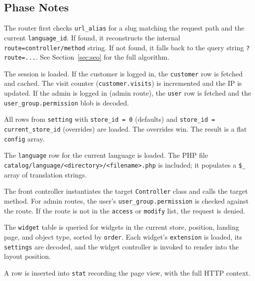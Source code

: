 \documentclass[11pt,a4paper]{article}
\begin{document}
\subsection{Phase Notes}

\begin{description}[leftmargin=1.6em,itemsep=2pt,font=\bfseries\small]
  \item[Phase 3 --- Router:] The router first checks
        \texttt{url\_alias} for a slug matching the request path
        and the current \texttt{language\_id}. If found, it
        reconstructs the internal \texttt{route=controller/method}
        string. If not found, it falls back to the query string
        \texttt{?route=...}. See Section~\ref{sec:seo} for the
        full algorithm.
  \item[Phase 4 --- Auth:] The session is loaded. If the customer
        is logged in, the \texttt{customer} row is fetched and
        cached. The visit counter (\texttt{customer.visits}) is
        incremented and the IP is updated. If the admin is
        logged in (admin route), the \texttt{user} row is fetched
        and the \texttt{user\_group.permission} blob is decoded.
  \item[Phase 5 --- Settings:] All rows from \texttt{setting}
        with \texttt{store\_id = 0} (defaults) and
        \texttt{store\_id = current\_store\_id} (overrides) are
        loaded. The overrides win. The result is a flat
        \texttt{config} array.
  \item[Phase 6 --- Language:] The \texttt{language} row for the
        current language is loaded. The PHP file
        \texttt{catalog/language/<directory>/<filename>.php} is
        included; it populates a \texttt{\$\_} array of
        translation strings.
  \item[Phase 8 --- Dispatch:] The front controller instantiates
        the target \texttt{Controller} class and calls the target
        method. For admin routes, the user's
        \texttt{user\_group.permission} is checked against the
        route. If the route is not in the \texttt{access} or
        \texttt{modify} list, the request is denied.
  \item[Phase 10 --- Layout:] The \texttt{widget} table is queried
        for widgets in the current store, position, landing page,
        and object type, sorted by \texttt{order}. Each widget's
        \texttt{extension} is loaded, its \texttt{settings} are
        decoded, and the widget controller is invoked to render
        into the layout position.
  \item[Phase 12 --- Stat:] A row is inserted into \texttt{stat}
        recording the page view, with the full HTTP context.
\end{description}
\end{document}
